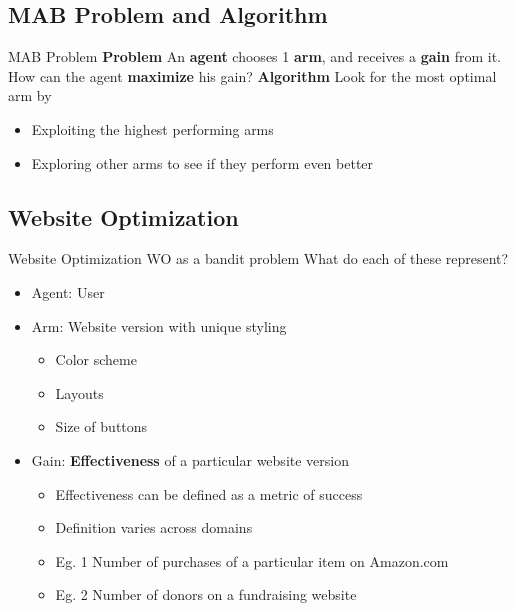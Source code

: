 \documentclass{beamer}
\begin{document}
\subsection{MAB Problem and Algorithm}
\begin{frame}{MAB Problem}
\textbf{Problem}
\newline An \textbf{agent} chooses 1 \textbf{arm}, and receives a \textbf{gain} from it.
\newline How can the agent \textbf{maximize} his gain?
\newline
\newline \textbf{Algorithm}
\newline Look for the most optimal arm by
\begin{itemize}
  \item Exploiting the highest performing arms
  \item Exploring other arms to see if they perform even better
\end{itemize}
\end{frame}

\subsection{Website Optimization}
\begin{frame}{Website Optimization}
WO as a bandit problem
\newline
\newline What do each of these represent?
\begin{itemize}
  \item Agent: User
  \item Arm: Website version with unique styling
	\begin{itemize}
		\item Color scheme
		\item Layouts 
		\item Size of buttons
	\end{itemize}
  \item Gain: \textbf{Effectiveness} of a particular website version
	\begin{itemize}
		\item Effectiveness can be defined as a metric of success 
		\item Definition varies across domains
		\item Eg. 1 Number of purchases of a particular item on Amazon.com
		\item Eg. 2 Number of donors on a fundraising website
	\end{itemize}
\end{itemize}
\end{frame}
\end{document}
